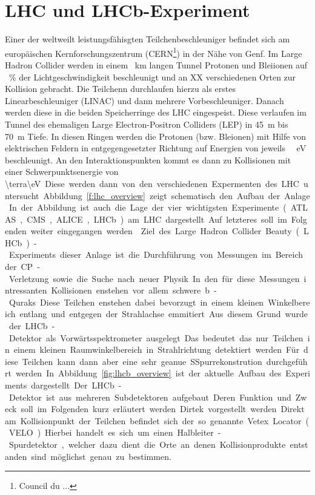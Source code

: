\chapter{LHC und LHCb-Experiment}
Einer der weltweilt leistungsfähisgten Teilchenbeschleuniger befindet sich am
europäischen Kernforschungszentrum (CERN\footnote{Council du ...}) in der Nähe
von Genf. Im Large Hadron Collider werden in einem \SI{}{\kilo\meter} langen
Tunnel Protonen und Bleiionen auf \SI{}{\percent} der Lichtgeschwindigkeit
beschleunigt und an XX verschiedenen Orten zur Kollision gebracht. 
Die Teilchenn durchlaufen hierzu als erstes Linearbeschleuniger (LINAC) und
dann mehrere Vorbeschleuniger. Danach werden diese in die beiden Speicherringe
des LHC eingespeist. Diese verlaufen im Tunnel des ehemaligen Large
Electron-Positron Colliders (LEP) in \SI{45}{\meter} bis
\SI{70}{\meter}\cite{evans}
Tiefe. In diesen Ringen werden die Protonen (bzw. Bleionen) mit Hilfe von
elektrischen Feldern in entgegengesetzter Richtung  auf Energien von jeweils
\SI{}{\terra\eV} beschleunigt. An den Interaktionspunkten kommt es dann zu
Kollisionen mit einer Schwerpunktsenergie von \SI{\terra\eV}. Diese werden dann
von den verschiedenen Expermenten des LHC untersucht. Abbildung
\ref{f:lhc_overview} zeigt schematisch den Aufbau der Anlage. In der Abbildung
ist auch die Lage der vier wichtigsten Experimente (ATLAS, CMS, ALICE, LHCb) am
LHC dargestellt. Auf letzteres soll im Folgenden weiter eingegangen werden.
\noindent
Ziel des Large Hadron Collider Beauty (LHCb)-Experiments dieser Anlage ist die Durchführung
von Messungen im Bereich der CP-Verletzung sowie die Suche nach neuer Physik.
In den für diese Messungen intressanten Kollisionen enstehen vor allem schwere
b-Quraks. Diese Teilchen enstehen dabei bevorzugt in einem kleinen
Winkelbereich entlang und entgegen der Strahlachse emmitiert. Aus diesem Grund
wurde der LHCb-Detektor als Vorwärtsspektrometer ausgelegt. Das bedeutet das
nur Teilchen in einem kleinen Raumwinkelbereich in Strahlrichtung detektiert
werden. Für diese Teilchen kann dann aber eine sehr geanue SSpurrekonstrution
durchgeführt werden.
In Abbildung \ref{fig:lhcb_overview} ist der aktuelle Aufbau des Experiments
dargestellt. Der LHCb-Detektor ist aus mehreren Subdetektoren aufgebaut. Deren
Funktion und Zweck soll im Folgenden kurz erläutert werden.
Dirtek
vorgestellt werden. Direkt am Kollisionpunkt der Teilchen befindet sich der so
genannte Vetex Locator (VELO). Hierbei handelt es sich um einen
Halbleiter-Spurdetektor, welcher dazu dient die Orte an denen Kollisionprodukte
entstanden sind möglichst genau zu bestimmen. 
